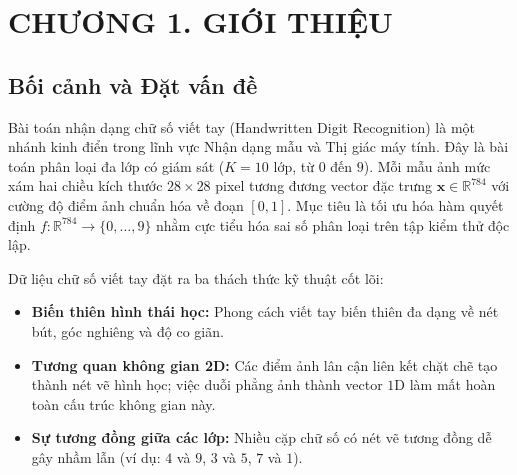 \section*{CHƯƠNG 1. GIỚI THIỆU}
\setcounter{section}{1}
\setcounter{subsection}{0}

\subsection{Bối cảnh và Đặt vấn đề}
Bài toán nhận dạng chữ số viết tay (Handwritten Digit Recognition) là một nhánh kinh điển trong lĩnh vực Nhận dạng mẫu và Thị giác máy tính. Đây là bài toán phân loại đa lớp có giám sát ($K = 10$ lớp, từ $0$ đến $9$). Mỗi mẫu ảnh mức xám hai chiều kích thước $28 \times 28$ pixel tương đương vector đặc trưng $\mathbf{x} \in \mathbb{R}^{784}$ với cường độ điểm ảnh chuẩn hóa về đoạn $[0, 1]$. Mục tiêu là tối ưu hóa hàm quyết định $f: \mathbb{R}^{784} \rightarrow \{0, \dots, 9\}$ nhằm cực tiểu hóa sai số phân loại trên tập kiểm thử độc lập.

Dữ liệu chữ số viết tay đặt ra ba thách thức kỹ thuật cốt lõi:
\begin{itemize}
    \item \textbf{Biến thiên hình thái học:} Phong cách viết tay biến thiên đa dạng về nét bút, góc nghiêng và độ co giãn.
    \item \textbf{Tương quan không gian 2D:} Các điểm ảnh lân cận liên kết chặt chẽ tạo thành nét vẽ hình học; việc duỗi phẳng ảnh thành vector $1\text{D}$ làm mất hoàn toàn cấu trúc không gian này.
    \item \textbf{Sự tương đồng giữa các lớp:} Nhiều cặp chữ số có nét vẽ tương đồng dễ gây nhầm lẫn (ví dụ: $4$ và $9$, $3$ và $5$, $7$ và $1$).
\end{itemize}

